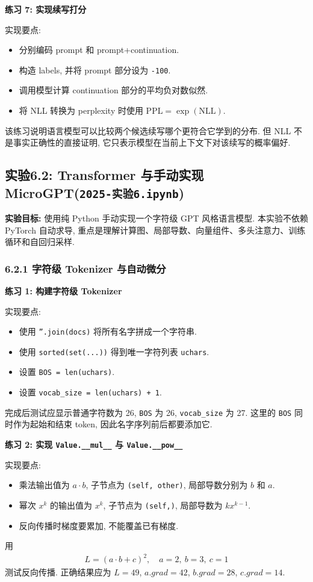 \documentclass{../../nndlcourse}
\begin{document}
\textbf{练习 7: 实现续写打分}

实现要点:
\begin{itemize}
    \item 分别编码 prompt 和 prompt+continuation.
    \item 构造 labels, 并将 prompt 部分设为 \texttt{-100}.
    \item 调用模型计算 continuation 部分的平均负对数似然.
    \item 将 NLL 转换为 perplexity 时使用 $\mathrm{PPL}=\exp(\mathrm{NLL})$.
\end{itemize}
该练习说明语言模型可以比较两个候选续写哪个更符合它学到的分布. 但 NLL 不是事实正确性的直接证明, 它只表示模型在当前上下文下对该续写的概率偏好.

\subsection*{实验6.2: Transformer 与手动实现 MicroGPT(\texttt{2025-实验6.ipynb})}

\textbf{实验目标: }使用纯 Python 手动实现一个字符级 GPT 风格语言模型. 本实验不依赖 PyTorch 自动求导, 重点是理解计算图、局部导数、向量组件、多头注意力、训练循环和自回归采样.

\subsubsection*{6.2.1 字符级 Tokenizer 与自动微分}

\textbf{练习 1: 构建字符级 Tokenizer}

实现要点:
\begin{itemize}
    \item 使用 \texttt{''.join(docs)} 将所有名字拼成一个字符串.
    \item 使用 \texttt{sorted(set(...))} 得到唯一字符列表 \texttt{uchars}.
    \item 设置 \texttt{BOS = len(uchars)}.
    \item 设置 \texttt{vocab\_size = len(uchars) + 1}.
\end{itemize}
完成后测试应显示普通字符数为 26, \texttt{BOS} 为 26, \texttt{vocab\_size} 为 27. 这里的 \texttt{BOS} 同时作为起始和结束 token, 因此名字序列前后都要添加它.

\textbf{练习 2: 实现 \texttt{Value.\_\_mul\_\_} 与 \texttt{Value.\_\_pow\_\_}}

实现要点:
\begin{itemize}
    \item 乘法输出值为 $a\cdot b$, 子节点为 \texttt{(self, other)}, 局部导数分别为 $b$ 和 $a$.
    \item 幂次 $x^k$ 的输出值为 $x^k$, 子节点为 \texttt{(self,)}, 局部导数为 $kx^{k-1}$.
    \item 反向传播时梯度要累加, 不能覆盖已有梯度.
\end{itemize}
用
\begin{align}
    L=(a\cdot b+c)^2,\quad a=2,\ b=3,\ c=1
\end{align}
测试反向传播. 正确结果应为 $L=49$, $a.grad=42$, $b.grad=28$, $c.grad=14$.
\end{document}
